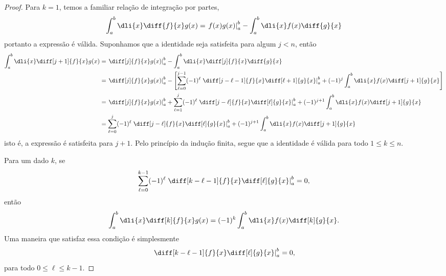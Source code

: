 \begin{proof}
    Para \(k = 1\), temos a familiar relação de integração por partes,
    \begin{equation*}
        \int_{a}^{b} \dli{x} \diff{f}{x}g(x) = \left.f(x)g(x)\right\rvert_{a}^{b} - \int_{a}^{b} \dli{x}f(x)\diff{g}{x}
    \end{equation*}
    portanto a expressão é válida. Suponhamos que a identidade seja satisfeita para algum \(j < n\), então
    \begin{align*}
        \int_{a}^{b} \dli{x} \diff[j+1]{f}{x}g(x) &= \left.\diff[j]{f}{x}g(x)\right\rvert_{a}^{b} - \int_{a}^{b}\dli{x} \diff[j]{f}{x}\diff{g}{x}\\
                                                  &= \left.\diff[j]{f}{x}g(x)\right\rvert_{a}^{b} -\left[\sum_{\ell = 0}^{j-1} (-1)^{\ell} \left.\diff[j-\ell-1]{f}{x}\diff[\ell+1]{g}{x}\right\rvert_a^b + (-1)^{j} \int_{a}^{b}\dli{x} f(x)\diff[j+1]{g}{x}\right]\\
                                                  &= \left.\diff[j]{f}{x}g(x)\right\rvert_{a}^{b} +\sum_{\ell = 1}^{j} (-1)^{\ell} \left.\diff[j-\ell]{f}{x}\diff[\ell]{g}{x}\right\rvert_a^b + (-1)^{j+1} \int_{a}^{b}\dli{x} f(x)\diff[j+1]{g}{x}\\
                                                  &= \sum_{\ell = 0}^{j} (-1)^{\ell} \left.\diff[j-\ell]{f}{x}\diff[\ell]{g}{x}\right\rvert_a^b + (-1)^{j+1} \int_{a}^{b}\dli{x} f(x)\diff[j+1]{g}{x}
    \end{align*}
    isto é, a expressão é satisfeita para \(j + 1\). Pelo princípio da indução finita, segue que a identidade é válida para todo \(1 \leq k \leq n\).

    Para um dado \(k\), se
    \begin{equation*}
        \sum_{\ell = 0}^{k-1} (-1)^{\ell} \left.\diff[k-\ell-1]{f}{x}\diff[\ell]{g}{x}\right\rvert_a^b = 0,
    \end{equation*}
    então
    \begin{equation*}
        \int_{a}^{b} \dli{x} \diff[k]{f}{x}g(x) = (-1)^k \int_{a}^{b}\dli{x} f(x)\diff[k]{g}{x}.
    \end{equation*}
    Uma maneira que satisfaz essa condição é simplesmente
    \begin{equation*}
        \left.\diff[k-\ell-1]{f}{x}\diff[\ell]{g}{x}\right\rvert_a^b = 0,
    \end{equation*}
    para todo \(0 \leq \ell \leq k - 1\).
\end{proof}

